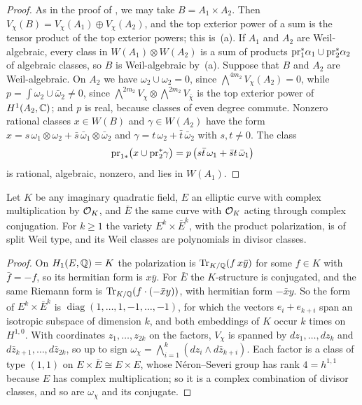 \begin{proof}
As in the proof of , we may take $B=A_{1}\times
A_{2}$. Then $V_{\chi}(B)=V_{\chi}(A_{1})\oplus V_{\chi}(A_{2})$, and the top
exterior power of a sum is the tensor product of the top exterior powers;
this is~(a). If $A_{1}$ and $A_{2}$ are Weil-algebraic, every class in
$W(A_{1})\otimes W(A_{2})$ is a sum of products $\mathrm{pr}_{1}^{*}\alpha_{1}\cup
\mathrm{pr}_{2}^{*}\alpha_{2}$ of algebraic classes, so $B$ is Weil-algebraic by~(a).
Suppose that $B$ and $A_{2}$ are Weil-algebraic. On $A_{2}$ we have
$\omega_{2}\cup\omega_{2}=0$, since $\bigwedge^{4m_{2}}V_{\chi}(A_{2})=0$,
while $p=\int\omega_{2}\cup\bar\omega_{2}\ne0$, since
$\bigwedge^{2m_{2}}V_{\chi}\otimes\bigwedge^{2m_{2}}V_{\bar\chi}$ is the top
exterior power of $H^{1}(A_{2},\mathbb{C})$; and $p$ is real, because classes of
even degree commute. Nonzero rational classes $x\in W(B)$ and $\gamma\in
W(A_{2})$ have the form $x=s\,\omega_{1}\otimes\omega_{2}+\bar s\,
\bar\omega_{1}\otimes\bar\omega_{2}$ and $\gamma=t\,\omega_{2}+\bar t\,
\bar\omega_{2}$ with $s,t\ne0$. The class
\[
  \mathrm{pr}_{1*}\bigl(x\cup\mathrm{pr}_{2}^{*}\gamma\bigr)=p\,\bigl(s\bar t\,\omega_{1}+
  \bar st\,\bar\omega_{1}\bigr)
\]
is rational, algebraic, nonzero, and lies in $W(A_{1})$.
\end{proof}

\begin{lemma}\label{lem:EEbar}
Let $K$ be any imaginary quadratic field, $E$ an elliptic curve with complex
multiplication by $\mathcal{O}_{K}$, and $\bar E$ the same curve with $\mathcal{O}_{K}$
acting through complex conjugation. For $k\ge1$ the variety $E^{k}\times
\bar E^{k}$, with the product polarization, is of split Weil type, and its
Weil classes are polynomials in divisor classes.
\end{lemma}

\begin{proof}
On $H_{1}(E,\mathbb{Q})=K$ the polarization is $\operatorname{Tr}_{K/\mathbb{Q}}(f\,x\bar
y)$ for some $f\in K$ with $\bar f=-f$, so its hermitian form is
$x\bar y$. For $\bar E$ the $K$-structure is conjugated, and the same
Riemann form is $\operatorname{Tr}_{K/\mathbb{Q}}(f\cdot(-\bar xy))$, with
hermitian form $-\bar xy$. So the form of $E^{k}\times\bar E^{k}$ is
$\operatorname{diag}(1,\dots,1,-1,\dots,-1)$, for which the vectors
$e_{i}+e_{k+i}$ span an isotropic subspace of dimension $k$, and both
embeddings of $K$ occur $k$ times on $H^{1,0}$. With coordinates
$z_{1},\dots,z_{2k}$ on the factors, $V_{\chi}$ is spanned by $dz_{1},\dots,
dz_{k}$ and $d\bar z_{k+1},\dots,d\bar z_{2k}$, so up to sign
$\omega_{\chi}=\bigwedge_{i=1}^{k}(dz_{i}\wedge d\bar z_{k+i})$. Each factor
is a class of type $(1,1)$ on $E\times\bar E\cong E\times E$, whose
N\'eron--Severi group has rank $4=h^{1,1}$ because $E$ has complex
multiplication; so it is a complex combination of divisor classes, and so
are $\omega_{\chi}$ and its conjugate.
\end{proof}

